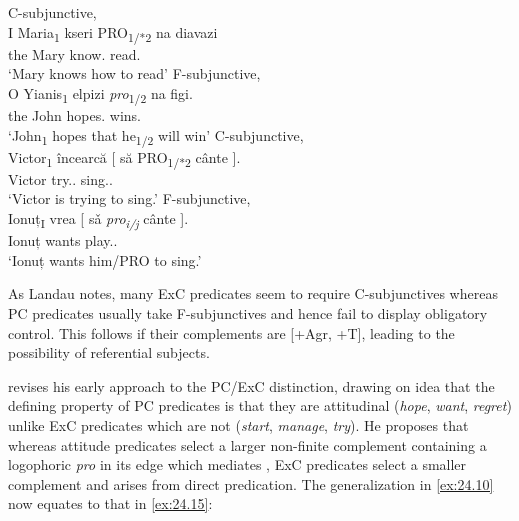 \documentclass[output=paper]{langsci/langscibook}
\begin{document}
\ea\label{ex:24.11} C-subjunctive, \\
    \gll I Maria\textsubscript{1}   kseri PRO\textsubscript{1/*2} na   diavazi \\
		the Mary   know.\Tsg{} {}  \Ptcl{}   read.\Tsg{}\\
	\glt ‘Mary knows how to read’
\ex\label{ex:24.12} F-subjunctive,  \parencite[(21)]{Varlokosta1994}\\
	\gll O Yianis\textsubscript{1}   elpizi  \emph{pro}\textsubscript{1/2} na   figi. \\
		the John   hopes.\Tsg{} {}    \Ptcl{}   wins.\Tsg{} \\
	\glt ‘John\textsubscript{1} hopes that he\textsubscript{1/2} will win’
\ex\label{ex:24.13} C-subjunctive,  \parencite[6]{Alboiu2007}\\
	\gll Victor\textsubscript{1}  încearcă   [ să          PRO\textsubscript{1/*2} cânte ].\\
        Victor    try.\Prs.\Tsg{} {} \Sbjv{} {}    sing.\Sbjv.\Tsg{}\\
	\glt ‘Victor is trying to sing.’
\ex\label{ex:24.14} F-subjunctive, \\
	\gll Ionuț\textsubscript{I} vrea  [ sǎ     \emph{pro\textsubscript{i/j}}\textsubscript{}  cânte ].\\
            Ionuț    wants {}  \Sbjv{} {} play.\Sbjv{}.\Tsg{}\\
	\glt ‘Ionuț wants him/PRO to sing.’
\z

As Landau notes, many \gls{ExC} predicates seem
to require C-subjunctives where\-as \gls{PC}
predicates usually take F-subjunctives and hence fail to display obligatory
control. This follows if their complements are [+Agr, +T], leading to the
possibility of referential subjects.

\citet{Landau2015} revises his early approach to the \gls{PC}/\gls{ExC}
distinction, drawing on  idea that the defining property
of \gls{PC} predicates is that they are attitudinal
(\emph{hope}, \emph{want}, \emph{regret}) unlike
\gls{ExC} predicates which are not
(\emph{start}, \emph{manage}, \emph{try}). He proposes that whereas attitude
predicates select a larger non-finite complement containing a logophoric
\emph{pro} in its edge which mediates , \gls{ExC} predicates select a smaller complement and  arises from direct
predication. The generalization in \eqref{ex:24.10} now equates to that in
\eqref{ex:24.15}:
\end{document}
